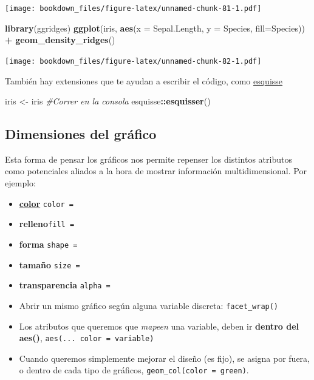 \documentclass[]{book}
\newenvironment{Shaded}{\begin{snugshade}}{\end{snugshade}}
\newcommand{\CommentTok}[1]{\textcolor[rgb]{0.56,0.35,0.01}{\textit{#1}}}
\newcommand{\DataTypeTok}[1]{\textcolor[rgb]{0.13,0.29,0.53}{#1}}
\newcommand{\KeywordTok}[1]{\textcolor[rgb]{0.13,0.29,0.53}{\textbf{#1}}}
\newcommand{\NormalTok}[1]{#1}
\newcommand{\OperatorTok}[1]{\textcolor[rgb]{0.81,0.36,0.00}{\textbf{#1}}}
\newcommand{\StringTok}[1]{\textcolor[rgb]{0.31,0.60,0.02}{#1}}
\begin{document}
\texttt{[image: bookdown\_files/figure-latex/unnamed-chunk-81-1.pdf]}

\begin{Shaded}
\begin{Highlighting}[]
\KeywordTok{library}\NormalTok{(ggridges)}
\KeywordTok{ggplot}\NormalTok{(iris, }\KeywordTok{aes}\NormalTok{(}\DataTypeTok{x =}\NormalTok{ Sepal.Length, }\DataTypeTok{y =}\NormalTok{ Species, }\DataTypeTok{fill=}\NormalTok{Species)) }\OperatorTok{+}\StringTok{ }
\StringTok{  }\KeywordTok{geom_density_ridges}\NormalTok{()}
\end{Highlighting}
\end{Shaded}

\texttt{[image: bookdown\_files/figure-latex/unnamed-chunk-82-1.pdf]}

También hay extensiones que te ayudan a escribir el código, como \href{https://dreamrs.github.io/esquisse/}{esquisse}

\begin{Shaded}
\begin{Highlighting}[]
\NormalTok{iris <-}\StringTok{ }\NormalTok{iris}
\CommentTok{#Correr en la consola}
\NormalTok{esquisse}\OperatorTok{::}\KeywordTok{esquisser}\NormalTok{()}
\end{Highlighting}
\end{Shaded}

\hypertarget{dimensiones-del-grafico}{%
\subsection{Dimensiones del gráfico}\label{dimensiones-del-grafico}}

Esta forma de pensar los gráficos nos permite repenser los distintos atributos como potenciales aliados a la hora de mostrar información multidimensional. Por ejemplo:

\begin{itemize}
\item
  \href{http://www.stat.columbia.edu/~tzheng/files/Rcolor.pdf}{\textbf{color}} \texttt{color\ =}
\item
  \textbf{relleno}\texttt{fill\ =}
\item
  \textbf{forma} \texttt{shape\ =}
\item
  \textbf{tamaño} \texttt{size\ =}
\item
  \textbf{transparencia} \texttt{alpha\ =}
\item
  Abrir un mismo gráfico según alguna variable discreta: \texttt{facet\_wrap()}
\item
  Los atributos que queremos que \emph{mapeen} una variable, deben ir \textbf{dentro del aes()}, \texttt{aes(...\ color\ =\ variable)}
\item
  Cuando queremos simplemente mejorar el diseño (es fijo), se asigna por fuera, o dentro de cada tipo de gráficos, \texttt{geom\_col(color\ =\ \textquotesingle{}green\textquotesingle{})}.
\end{itemize}
\end{document}
